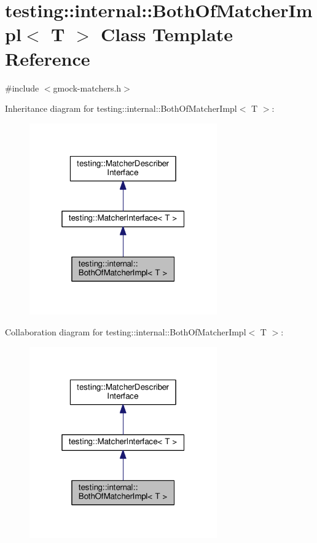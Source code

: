\hypertarget{classtesting_1_1internal_1_1BothOfMatcherImpl}{}\section{testing\+:\+:internal\+:\+:Both\+Of\+Matcher\+Impl$<$ T $>$ Class Template Reference}
\label{classtesting_1_1internal_1_1BothOfMatcherImpl}


{\ttfamily \#include $<$gmock-\/matchers.\+h$>$}



Inheritance diagram for testing\+:\+:internal\+:\+:Both\+Of\+Matcher\+Impl$<$ T $>$\+:\nopagebreak
\begin{figure}[H]
\begin{center}
\leavevmode
\includegraphics[width=229pt]{classtesting_1_1internal_1_1BothOfMatcherImpl__inherit__graph}
\end{center}
\end{figure}


Collaboration diagram for testing\+:\+:internal\+:\+:Both\+Of\+Matcher\+Impl$<$ T $>$\+:\nopagebreak
\begin{figure}[H]
\begin{center}
\leavevmode
\includegraphics[width=229pt]{classtesting_1_1internal_1_1BothOfMatcherImpl__coll__graph}
\end{center}
\end{figure}
